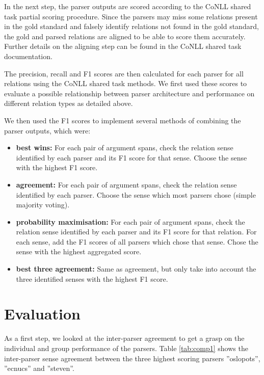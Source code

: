\documentclass[10pt,notitlepage]{scrartcl}
\begin{document}
In the next step, the parser outputs are scored according to the CoNLL shared task partial scoring procedure. Since the parsers may miss some relations present in the gold standard and falsely identify relations not found in the gold standard, the gold and parsed relations are aligned to be able to score them accurately. Further details on the aligning step can be found in the CoNLL shared task documentation.

The precision, recall and F1 scores are then calculated for each parser for all relations using the CoNLL shared task methods. We first used these scores to evaluate a possible relationship between parser architecture and performance on different relation types as detailed above.

We then used the F1 scores to implement several methods of combining the parser outputs, which were:
\begin{itemize}
\item \textbf{best wins:} For each pair of argument spans, check the relation sense identified by each parser and its F1 score for that sense. Choose the sense with the highest F1 score.
\item \textbf{agreement:} For each pair of argument spans, check the relation sense identified by each parser. Choose the sense which most parsers chose (simple majority voting).
\item \textbf{probability maximisation:} For each pair of argument spans, check the relation sense identified by each parser and its F1 score for that relation. For each sense, add the F1 scores of all parsers which chose that sense. Chose the sense with the highest aggregated score.
\item \textbf{best three agreement:} Same as agreement, but only take into account the three identified senses with the highest F1 score.
\end{itemize}

\section*{Evaluation}
As a first step, we looked at the inter-parser agreement to get a grasp on the individual and group performance of the parsers. Table \ref{tab:comp1} shows the inter-parser sense agreement between the three highest scoring parsers ''oslopots'', ''ecnucs'' and ''steven''.
\end{document}
